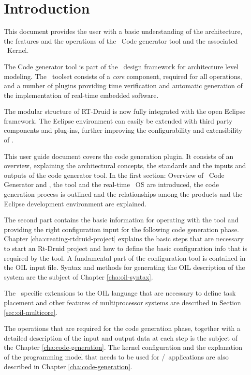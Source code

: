 
\chapter{Introduction}
\label{cha:intro}

This document provides the user with a basic understanding of the
architecture, the features and the operations of the \rtd\ Code
generator tool and the associated
\ee\ Kernel.

The Code generator tool is part of the \rtd\ design framework for
architecture level modeling. The \rtd\ toolset consists of a {\em
core} component, required for all operations, and a number of plugins
providing time verification and automatic generation of the
implementation of real-time embedded software.

The modular structure of RT-Druid is now fully integrated with the
open Eclipse framework. The Eclipse environment can easily be extended
with third party components and plug-ins, further improving the
configurability and extensibility of \rtd{}.



This user guide document covers the code generation plugin. It
consists of an overview, explaining the architectural concepts, the
standards and the inputs and outputs of the code generator tool. In
the first section: Overview of \rtd\ Code Generator and \ee, the tool
and the
real-time \ee\ OS are introduced, the code generation process is
outlined and the relationships among the products and the Eclipse
development environment are explained. 

The second part contains the basic information for operating with the
tool and providing the right configuration input for the following
code generation phase. Chapter \ref{cha:creating-rtdruid-project}
explains the basic steps that are necessary to start an Rt-Druid
project and how to define the basic configuration info that is
required by the tool. A fundamental part of the configuration tool is
contained in the OIL input file. Syntax and methods for
generating the OIL description of the system are the subject of
Chapter \ref{cha:oil-syntax}.

The \ee\ specific extensions to the OIL language that are necessary to
define task placement and other features of multiprocessor systems are
described in Section \ref{sec:oil-multicore}.

The operations that are required for the code generation phase,
together with a detailed description of the input and output data at
each step is the subject of the Chapter \ref{cha:code-generation}.
The kernel configuration and the explanation of the programming model
that needs to be used for \rtd/\ee\ applications are also described in
Chapter \ref{cha:code-generation}.

